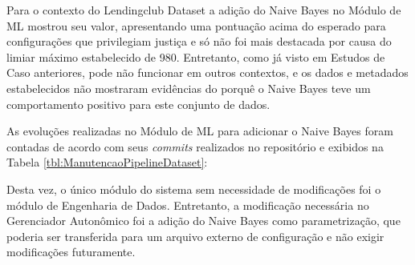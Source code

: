 \documentclass[Portugues,Final]{ic-tese-v3}
\begin{document}
Para o contexto do Lendingclub Dataset a adição do Naive Bayes no Módulo de ML mostrou seu valor, apresentando uma pontuação acima do esperado para configurações que privilegiam justiça e só não foi mais destacada por causa do limiar máximo estabelecido de 980. Entretanto, como já visto em Estudos de Caso anteriores, pode não funcionar em outros contextos, e os dados e metadados estabelecidos não mostraram evidências do porquê o Naive Bayes teve um comportamento positivo para este conjunto de dados.

As evoluções realizadas no Módulo de ML para adicionar o Naive Bayes foram contadas de acordo com seus \textit{commits} realizados no repositório e exibidos  na Tabela \ref{tbl:ManutencaoPipelineDataset}:

\begin{table}[H]
\begin{center}
  \caption{Quantidade de modificações realizadas ao adicionar um novo algoritmo ao Módulo de ML}
\label{tbl:ManutencaoPipelineCaso3}
\end{center}
\end{table}

Desta vez, o único módulo do sistema sem necessidade de modificações foi o módulo de Engenharia de Dados. Entretanto, a modificação necessária no Gerenciador Autonômico foi a adição do Naive Bayes como parametrização, que poderia ser transferida para um arquivo externo de configuração e não exigir modificações futuramente.
\end{document}
